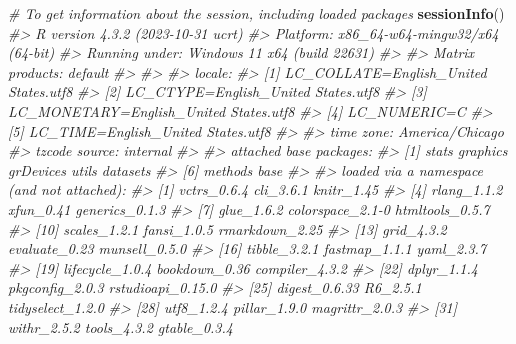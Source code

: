 \documentclass[
]{book}
\newenvironment{Shaded}{\begin{snugshade}}{\end{snugshade}}
\newcommand{\CommentTok}[1]{\textcolor[rgb]{0.56,0.35,0.01}{\textit{#1}}}
\newcommand{\FunctionTok}[1]{\textcolor[rgb]{0.13,0.29,0.53}{\textbf{#1}}}
\newcommand{\NormalTok}[1]{#1}
\begin{document}
\begin{Shaded}
\begin{Highlighting}[]
\CommentTok{\# To get information about the session, including loaded packages}
\FunctionTok{sessionInfo}\NormalTok{()}
\CommentTok{\#\textgreater{} R version 4.3.2 (2023{-}10{-}31 ucrt)}
\CommentTok{\#\textgreater{} Platform: x86\_64{-}w64{-}mingw32/x64 (64{-}bit)}
\CommentTok{\#\textgreater{} Running under: Windows 11 x64 (build 22631)}
\CommentTok{\#\textgreater{} }
\CommentTok{\#\textgreater{} Matrix products: default}
\CommentTok{\#\textgreater{} }
\CommentTok{\#\textgreater{} }
\CommentTok{\#\textgreater{} locale:}
\CommentTok{\#\textgreater{} [1] LC\_COLLATE=English\_United States.utf8 }
\CommentTok{\#\textgreater{} [2] LC\_CTYPE=English\_United States.utf8   }
\CommentTok{\#\textgreater{} [3] LC\_MONETARY=English\_United States.utf8}
\CommentTok{\#\textgreater{} [4] LC\_NUMERIC=C                          }
\CommentTok{\#\textgreater{} [5] LC\_TIME=English\_United States.utf8    }
\CommentTok{\#\textgreater{} }
\CommentTok{\#\textgreater{} time zone: America/Chicago}
\CommentTok{\#\textgreater{} tzcode source: internal}
\CommentTok{\#\textgreater{} }
\CommentTok{\#\textgreater{} attached base packages:}
\CommentTok{\#\textgreater{} [1] stats     graphics  grDevices utils     datasets }
\CommentTok{\#\textgreater{} [6] methods   base     }
\CommentTok{\#\textgreater{} }
\CommentTok{\#\textgreater{} loaded via a namespace (and not attached):}
\CommentTok{\#\textgreater{}  [1] vctrs\_0.6.4       cli\_3.6.1         knitr\_1.45       }
\CommentTok{\#\textgreater{}  [4] rlang\_1.1.2       xfun\_0.41         generics\_0.1.3   }
\CommentTok{\#\textgreater{}  [7] glue\_1.6.2        colorspace\_2.1{-}0  htmltools\_0.5.7  }
\CommentTok{\#\textgreater{} [10] scales\_1.2.1      fansi\_1.0.5       rmarkdown\_2.25   }
\CommentTok{\#\textgreater{} [13] grid\_4.3.2        evaluate\_0.23     munsell\_0.5.0    }
\CommentTok{\#\textgreater{} [16] tibble\_3.2.1      fastmap\_1.1.1     yaml\_2.3.7       }
\CommentTok{\#\textgreater{} [19] lifecycle\_1.0.4   bookdown\_0.36     compiler\_4.3.2   }
\CommentTok{\#\textgreater{} [22] dplyr\_1.1.4       pkgconfig\_2.0.3   rstudioapi\_0.15.0}
\CommentTok{\#\textgreater{} [25] digest\_0.6.33     R6\_2.5.1          tidyselect\_1.2.0 }
\CommentTok{\#\textgreater{} [28] utf8\_1.2.4        pillar\_1.9.0      magrittr\_2.0.3   }
\CommentTok{\#\textgreater{} [31] withr\_2.5.2       tools\_4.3.2       gtable\_0.3.4}
\end{Highlighting}
\end{Shaded}
\end{document}
